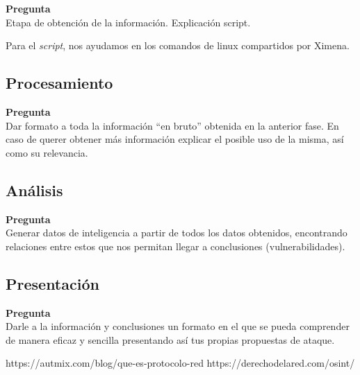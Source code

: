 \documentclass{article}
\newenvironment{problem}[2][Pregunta]
    { \begin{mdframed}[backgroundcolor=gray!20] \textbf{#1 #2} \\}
    {  \end{mdframed}}
\begin{document}
\begin{problem}
{} Etapa de obtención de la información. Explicación script.  
\end{problem}

Para el {\it script}, nos ayudamos en los comandos de linux compartidos por Ximena.


\subsection{Procesamiento}

\begin{problem}
{} Dar formato a toda la información “en bruto” obtenida en la anterior fase.
En caso de querer obtener más información explicar el posible uso de la misma, así como su
relevancia.  
\end{problem}



\subsection{Análisis}

\begin{problem}
  {}
  Generar datos de inteligencia a partir de todos los datos obtenidos, encontrando
relaciones entre estos que nos permitan llegar a conclusiones (vulnerabilidades).
\end{problem}

\subsection{Presentación}

\begin{problem}
  {}
  Darle a la información y conclusiones un formato en el que se pueda comprender
  de manera eficaz y sencilla presentando así tus propias propuestas de ataque.
\end{problem}

\begin{thebibliography}{2} %
\bibitem{} https://autmix.com/blog/que-es-protocolo-red
\bibitem{} https://derechodelared.com/osint/
\end{thebibliography}
\end{document}
